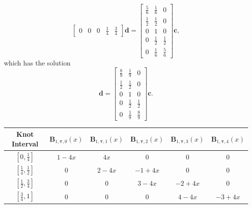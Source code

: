 \begin{indentedexample}
\begin{equation*}
\begin{bmatrix}
                0 & 0 & 0 & \frac{1}{4} & \frac{3}{4}
            \end{bmatrix}
            \mathbf{d}
            =
            \begin{bmatrix}
                \frac{5}{6} & \frac{1}{6} & 0 \\
                \frac{1}{2} & \frac{1}{2} & 0 \\
                0 & 1 & 0 \\
                0 & \frac{1}{2} & \frac{1}{2} \\
                0 & \frac{1}{6} & \frac{5}{6}
            \end{bmatrix}
            \mathbf c,
        \end{equation*}
        which has the solution
        \begin{equation*}
            \mathbf d = \begin{bmatrix}
                \frac{8}{9} & \frac{1}{9} & 0 \\
                \frac{1}{2} & \frac{1}{2} & 0 \\
                0 & 1 & 0 \\
                0 & \frac{1}{2} & \frac{1}{2} \\
                0 & \frac{1}{9} & \frac{8}{9}
            \end{bmatrix}
            \mathbf c.
        \end{equation*}

            \centering
            \begin{tabular}{c|c|c|c|c|c}
                Knot Interval & $\mathbf B_{1, \boldsymbol\tau, 0}(x)$ & $\mathbf B_{1, \boldsymbol\tau, 1}(x)$ & $\mathbf B_{1, \boldsymbol\tau, 2}(x)$ & $\mathbf B_{1, \boldsymbol\tau, 3}(x)$ & $\mathbf B_{1, \boldsymbol\tau, 4}(x)$ \\[5pt]
                \hline
                \rule{0pt}{2.5ex} $\left[0,\frac{1}{4}\right]$ & $1-4x$ & $4x$ & 0 & 0 & 0 \\[5pt]
                \hline
                \rule{0pt}{2.5ex} $\left[\frac{1}{4},\frac{1}{2}\right]$ & 0 & $2-4x$ & $-1+4x$ & 0 & 0 \\[5pt]
                \hline
                \rule{0pt}{2.5ex} $\left[\frac{1}{2},\frac{3}{4}\right]$ & 0 & 0 & $3-4x$ & $-2+4x$ & 0 \\[5pt]
                \hline
                \rule{0pt}{2.5ex} $\left[\frac{3}{4},1\right]$ & 0 & 0 & 0 & $4-4x$ & $-3+4x$
            \end{tabular}
            \label{tab:linear-spline-evaluation}

\end{indentedexample}

